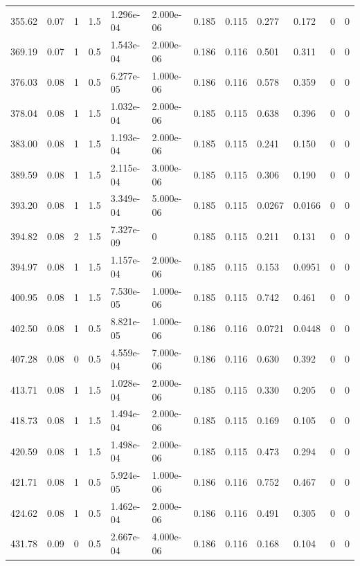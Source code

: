 \documentclass[preview]{standalone}
\begin{document}
{{{\begin{tabular}{L{1.2cm}C{1.2cm} C{0.3cm}C{0.5cm} C{1.4cm}C{1.4cm} C{1.4cm}C{1.4cm} C{1.6cm}C{1.6cm} C{1.6cm}C{1.6cm}}
  355.62  &  0.07  & 1     & 1.5 &  1.296e-04  & 2.000e-06  &  0.185&   0.115& 0.277 & 0.172   &  0 & 0  \\ 
  369.19  &  0.07  & 1     & 0.5 &  1.543e-04  & 2.000e-06  &  0.186&   0.116& 0.501 & 0.311   &  0 & 0  \\ 
  376.03  &  0.08  & 1     & 0.5 &  6.277e-05  & 1.000e-06  &  0.186&   0.116& 0.578 & 0.359   &  0 & 0  \\ 
  378.04  &  0.08  & 1     & 1.5 &  1.032e-04  & 2.000e-06  &  0.185&   0.115& 0.638 & 0.396   &  0 & 0  \\ 
  383.00  &  0.08  & 1     & 1.5 &  1.193e-04  & 2.000e-06  &  0.185&   0.115& 0.241 & 0.150   &  0 & 0  \\ 
  389.59  &  0.08  & 1     & 1.5 &  2.115e-04  & 3.000e-06  &  0.185&   0.115& 0.306 & 0.190   &  0 & 0  \\ 
  393.20  &  0.08  & 1     & 1.5 &  3.349e-04  & 5.000e-06  &  0.185&   0.115& 0.0267 & 0.0166   &  0 & 0  \\ 
  394.82  &  0.08  & 2     & 1.5 &  7.327e-09  & 0  &  0.185&   0.115& 0.211 & 0.131   &  0 & 0  \\ 
  394.97  &  0.08  & 1     & 1.5 &  1.157e-04  & 2.000e-06  &  0.185&   0.115& 0.153 & 0.0951   &  0 & 0  \\ 
  400.95  &  0.08  & 1     & 1.5 &  7.530e-05  & 1.000e-06  &  0.185&   0.115& 0.742 & 0.461   &  0 & 0  \\ 
  402.50  &  0.08  & 1     & 0.5 &  8.821e-05  & 1.000e-06  &  0.186&   0.116& 0.0721 & 0.0448   &  0 & 0  \\ 
  407.28  &  0.08  & 0     & 0.5 &  4.559e-04  & 7.000e-06  &  0.186&   0.116& 0.630 & 0.392   &  0 & 0  \\ 
  413.71  &  0.08  & 1     & 1.5 &  1.028e-04  & 2.000e-06  &  0.185&   0.115& 0.330 & 0.205   &  0 & 0  \\ 
  418.73  &  0.08  & 1     & 1.5 &  1.494e-04  & 2.000e-06  &  0.185&   0.115& 0.169 & 0.105   &  0 & 0  \\ 
  420.59  &  0.08  & 1     & 1.5 &  1.498e-04  & 2.000e-06  &  0.185&   0.115& 0.473 & 0.294   &  0 & 0  \\ 
  421.71  &  0.08  & 1     & 0.5 &  5.924e-05  & 1.000e-06  &  0.186&   0.116& 0.752 & 0.467   &  0 & 0  \\ 
  424.62  &  0.08  & 1     & 0.5 &  1.462e-04  & 2.000e-06  &  0.186&   0.116& 0.491 & 0.305   &  0 & 0  \\ 
  431.78  &  0.09  & 0     & 0.5 &  2.667e-04  & 4.000e-06  &  0.186&   0.116& 0.168 & 0.104   &  0 & 0  \\ 

\end{tabular}}}}
\end{document}
